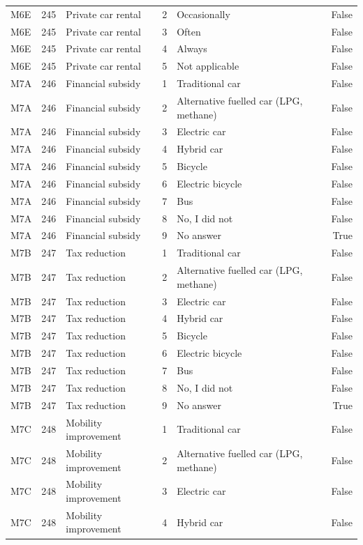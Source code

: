 \begin{tabular}{lrlllr}
M6E & 245 & Private car rental & 2 & Occasionally & False \\
M6E & 245 & Private car rental & 3 & Often & False \\
M6E & 245 & Private car rental & 4 & Always & False \\
M6E & 245 & Private car rental & 5 & Not applicable & False \\
M7A & 246 & Financial subsidy & 1 & Traditional car & False \\
M7A & 246 & Financial subsidy & 2 & Alternative fuelled car (LPG, methane) & False \\
M7A & 246 & Financial subsidy & 3 & Electric car & False \\
M7A & 246 & Financial subsidy & 4 & Hybrid car & False \\
M7A & 246 & Financial subsidy & 5 & Bicycle & False \\
M7A & 246 & Financial subsidy & 6 & Electric bicycle & False \\
M7A & 246 & Financial subsidy & 7 & Bus & False \\
M7A & 246 & Financial subsidy & 8 & No, I did not & False \\
M7A & 246 & Financial subsidy & 9 & No answer & True \\
M7B & 247 & Tax reduction & 1 & Traditional car & False \\
M7B & 247 & Tax reduction & 2 & Alternative fuelled car (LPG, methane) & False \\
M7B & 247 & Tax reduction & 3 & Electric car & False \\
M7B & 247 & Tax reduction & 4 & Hybrid car & False \\
M7B & 247 & Tax reduction & 5 & Bicycle & False \\
M7B & 247 & Tax reduction & 6 & Electric bicycle & False \\
M7B & 247 & Tax reduction & 7 & Bus & False \\
M7B & 247 & Tax reduction & 8 & No, I did not & False \\
M7B & 247 & Tax reduction & 9 & No answer & True \\
M7C & 248 & Mobility improvement & 1 & Traditional car & False \\
M7C & 248 & Mobility improvement & 2 & Alternative fuelled car (LPG, methane) & False \\
M7C & 248 & Mobility improvement & 3 & Electric car & False \\
M7C & 248 & Mobility improvement & 4 & Hybrid car & False \\

\end{tabular}
